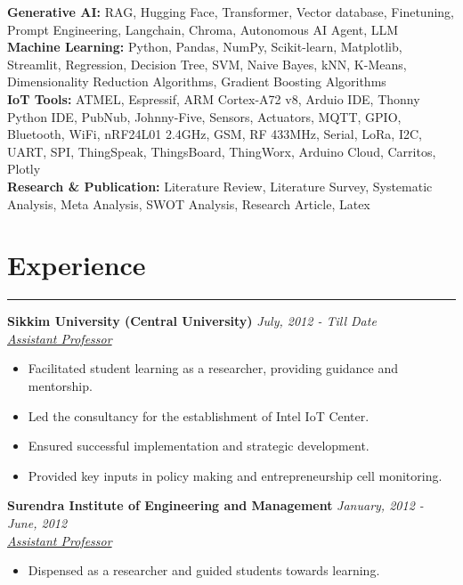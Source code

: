 \documentclass[10pt]{article}
\begin{document}
	

			\textbf{Generative AI:} RAG, Hugging Face, Transformer, Vector database, Finetuning, Prompt Engineering,  Langchain, Chroma, Autonomous AI Agent, LLM
		\\ 
		\textbf{Machine Learning:} Python, Pandas, NumPy, Scikit-learn, Matplotlib, Streamlit, Regression, Decision Tree, SVM, Naive Bayes, kNN, K-Means, Dimensionality Reduction Algorithms, Gradient Boosting Algorithms 
			\\
		\textbf{IoT Tools:} ATMEL, Espressif, ARM Cortex-A72 v8, Arduio IDE, Thonny Python IDE,  PubNub, Johnny-Five, Sensors, Actuators, MQTT, GPIO, Bluetooth, WiFi, nRF24L01 2.4GHz, GSM, RF 433MHz, Serial, LoRa, I2C, UART, SPI, ThingSpeak, ThingsBoard, ThingWorx, Arduino Cloud, Carritos, Plotly
		\\
		\textbf{Research \& Publication:} Literature Review, Literature Survey, Systematic Analysis, Meta Analysis, SWOT Analysis, Research Article, Latex 

    
		\vspace*{-3mm}
		
	

\section*{Experience}
\vspace*{-2.5mm}
\hrule 
\vspace*{2mm}
  \noindent\textbf{Sikkim University (Central University)} \hfill \textit{July, 2012 - Till Date}\\
  \textit{\underline{Assistant Professor}} \\
  \vspace*{-4mm}
    \begin{itemize}[leftmargin=*]
	\item Facilitated student learning as a researcher, providing guidance and mentorship.
	    \vspace*{-2.5mm}
	\item Led the consultancy for the establishment of Intel IoT Center. 
	\vspace*{-2.5mm}
	\item Ensured successful implementation and strategic development.
	    \vspace*{-2.5mm}
	\item Provided key inputs in policy making and entrepreneurship cell monitoring.  
	\end{itemize}

  \noindent\textbf{Surendra Institute of Engineering and Management} \hfill \textit{January, 2012 - June, 2012}\\
  \textit{\underline{Assistant Professor}} \\
\vspace*{-4mm}
\begin{itemize}[leftmargin=*]
	\item Dispensed as a researcher and guided students towards learning.

\end{itemize}
\end{document}
